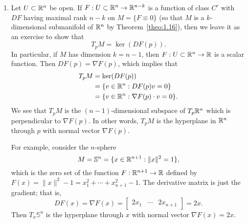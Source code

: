\begin{enumerate}[(1)]
    \item Let $U \subset \mathbb{R}^n$ be open. If $F : U \subset \mathbb{R}^n \to \mathbb{R}^{n-k}$ is a function of 
    class $C^r$ with $DF$ having maximal rank $n-k$ on $M = \{F \equiv 0\}$ 
    (so that $M$ is a $k$-dimensional submanifold of $\mathbb{R}^n$ by Theorem~\ref{theo:1.16}), 
    then we leave it as an exercise to show that 
    \[ T_pM = \ker(DF(p)). \] 
    In particular, if $M$ has dimension $k = n-1$, then $F : U \subset \mathbb{R}^n \to \mathbb{R}$ is a 
    scalar function. Then $DF(p) = \nabla F(p)$, which implies that 
    \begin{align*}
        T_pM &= \ker(DF(p)) \\ 
        &= \{v \in \mathbb{R}^n : DF(p)v = 0\} \\ 
        &= \{v \in \mathbb{R}^n : \nabla F(p) \cdot v = 0\}.
    \end{align*}
    We see that $T_pM$ is the $(n-1)$-dimensional subspace of $T_p\mathbb{R}^n$ 
    which is perpendicular to $\nabla F(p)$. In other words, $T_pM$ is the 
    hyperplane in $\mathbb{R}^n$ through $p$ with normal vector $\nabla F(p)$. 

    For example, consider the $n$-sphere 
    \[ M = \mathbb{S}^n = \{x \in \mathbb{R}^{n+1} : \|x\|^2 = 1\}, \] 
    which is the zero set of the function $F : \mathbb{R}^{n+1} \to \mathbb{R}$ defined by $F(x) = \|x\|^2 - 1 
    = x_1^2 + \cdots + x_{n+1}^2 - 1$. The derivative matrix is just the gradient; that is, 
    \[ DF(x) = \nabla F(x) = \begin{bmatrix} 2x_1 & \cdots & 2x_{n+1} \end{bmatrix} = 2x. \]
    Then $T_x\mathbb{S}^n$ is the hyperplane through $x$ with normal 
    vector $\nabla F(x) = 2x$.  
\end{enumerate}